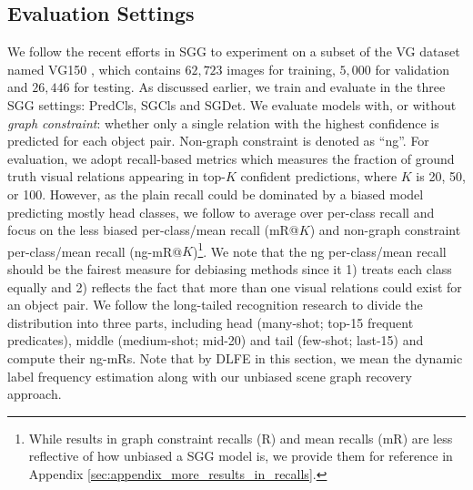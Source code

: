 \documentclass[sigconf]{acmart}
\begin{document}
\subsection{Evaluation Settings}
\label{sec:eval_setting}
We follow the recent efforts in SGG \cite{zellers2018neural,chen2019knowledge} to experiment on a subset of the VG dataset \cite{krishna2017visual} named VG150 \cite{xu2017scene}, which contains $62,723$ images for training, $5,000$ for validation and $26,446$ for testing.
As discussed earlier, we train and evaluate in the three SGG settings: PredCls, SGCls and SGDet.
We evaluate models with, or without \textit{graph constraint}: whether only a single relation with the highest confidence is predicted for each object pair.
Non-graph constraint is denoted as ``ng''.
For evaluation, we adopt recall-based metrics which measures the fraction of ground truth visual relations appearing in top-$K$ confident predictions, where $K$ is 20, 50, or 100.
However, as the plain recall could be dominated by a biased model predicting mostly head classes, we follow \cite{chen2019knowledge,tang2019learning,yan2020pcpl,DBLP:conf/bmvc/WangPL20} to average over per-class recall and focus on the less biased per-class/mean recall (mR@$K$) and non-graph constraint per-class/mean recall (ng-mR@$K$)\footnote{While results in graph constraint recalls (R) and mean recalls (mR) are less reflective of how unbiased a SGG model is, we provide them for reference in Appendix \ref{sec:appendix_more_results_in_recalls}.}.
We note that the ng per-class/mean recall should be the fairest measure for debiasing methods since it 1) treats each class equally and 2) reflects the fact that more than one visual relations could exist for an object pair.
We follow the long-tailed recognition research \cite{liu2019large} to divide the distribution into three parts, including head (many-shot; top-15 frequent predicates), middle (medium-shot; mid-20) and tail (few-shot; last-15) and compute their ng-mRs.
Note that by DLFE in this section, we mean the dynamic label frequency estimation along with our unbiased scene graph recovery approach.
\end{document}
